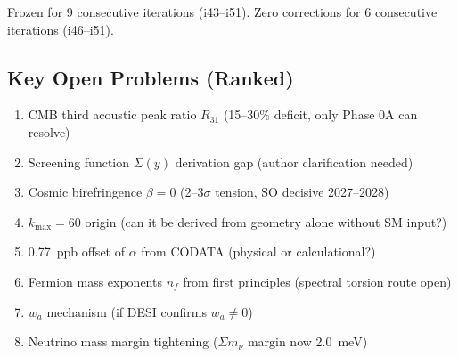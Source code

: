 \documentclass[11pt,a4paper]{article}
\begin{document}
Frozen for 9 consecutive iterations (i43--i51). Zero corrections for 6 consecutive iterations (i46--i51).

\subsection{Key Open Problems (Ranked)}

\begin{enumerate}
\item CMB third acoustic peak ratio $R_{31}$ (15--30\% deficit, only Phase 0A can resolve)
\item Screening function $\Sigma(y)$ derivation gap (author clarification needed)
\item Cosmic birefringence $\beta = 0$ (2--3$\sigma$ tension, SO decisive 2027--2028)
\item $k_{\max} = 60$ origin (can it be derived from geometry alone without SM input?)
\item 0.77~ppb offset of $\alpha$ from CODATA (physical or calculational?)
\item Fermion mass exponents $n_f$ from first principles (spectral torsion route open)
\item $w_a$ mechanism (if DESI confirms $w_a \neq 0$)
\item Neutrino mass margin tightening ($\Sigma m_\nu$ margin now 2.0~meV)
\end{enumerate}



\end{document}
